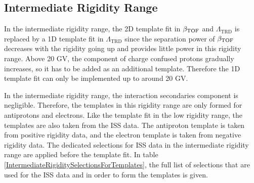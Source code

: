 \subsection*{Intermediate Rigidity Range}
In the intermediate rigidity range, the 2D template fit in $\beta_{\rm{TOF}}$ and $\Lambda_\mathrm{TRD}$ is replaced by a 1D template fit in $\Lambda_\mathrm{TRD}$ since the separation power of $\beta_{\rm{TOF}}$ decreases with the rigidity going up and provides little power in this rigidity range. Above 20 GV, the component of charge confused protons gradually increases, so it has to be added as an additional template. Therefore the 1D template fit can only be implemented up to around 20 GV. \par

In the intermediate rigidity range, the interaction secondaries component is negligible. Therefore, the templates in this rigidity range are only formed for antiprotons and electrons. Like the template fit in the low rigidity range, the templates are also taken from the ISS data. The antiproton template is taken from positive rigidity data, and the electron template is taken from negative rigidity data. The dedicated selections for ISS data in the intermediate rigidity range are applied before the template fit. In table \ref{IntermediateRigiditySelectionsForTemplates}, the full list of selections that are used for the ISS data and in order to form the templates is given.  \par

